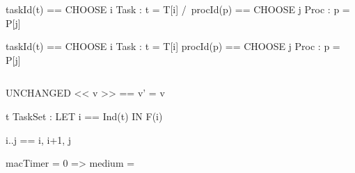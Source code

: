 \documentclass[msc]{mestrado}
\begin{document}
\begin{notla}
taskId(t) == CHOOSE i \in Task : t = T[i]  /\  procId(p) == CHOOSE j \in Proc : p = P[j]
\end{notla}
\begin{tlatex}
\end{tlatex}

\begin{notla}
taskId(t) == CHOOSE i \in Task : t = T[i]
procId(p) == CHOOSE j \in Proc : p = P[j]
\end{notla}
\begin{tlatex}
%
%
\end{tlatex}

\begin{verbatim}
\end{verbatim}

\begin{notla}
UNCHANGED << v >> == v' = v
\end{notla}
\begin{tlatex}
%
\end{tlatex}

\begin{notla}
\E t \in TaskSet : LET i == Ind(t)
                   IN F(i)
\end{notla}
\begin{tlatex}
%
%
\end{tlatex}

\begin{notla}
i..j == {i, i+1, j}
\end{notla}
\begin{tlatex}
%
\end{tlatex}


\begin{notla}
macTimer = 0  => medium = {}
\end{notla}
\begin{tlatex}
%
\end{tlatex}
\end{document}
